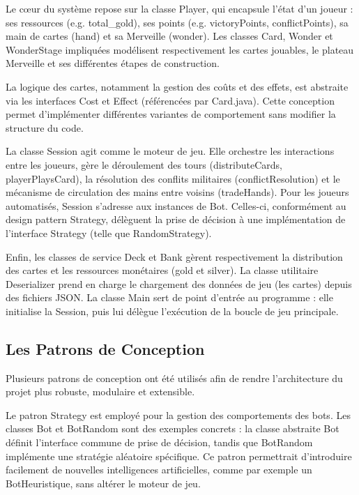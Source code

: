 Le cœur du système repose sur la classe Player, qui encapsule l'état d'un joueur : ses ressources (e.g. total\_gold), ses points (e.g. victoryPoints, conflictPoints), sa main de cartes (hand) et sa Merveille (wonder). Les classes Card, Wonder et WonderStage impliquées modélisent respectivement les cartes jouables, le plateau Merveille et ses différentes étapes de construction.

La logique des cartes, notamment la gestion des coûts et des effets, est abstraite via les interfaces Cost et Effect (référencées par Card.java). Cette conception permet d’implémenter différentes variantes de comportement sans modifier la structure du code.

La classe Session agit comme le moteur de jeu. Elle orchestre les interactions entre les joueurs, gère le déroulement des tours (distributeCards, playerPlaysCard), la résolution des conflits militaires (conflictResolution) et le mécanisme de circulation des mains entre voisins (tradeHands). Pour les joueurs automatisés, Session s'adresse aux instances de Bot. Celles-ci, conformément au design pattern Strategy, délèguent la prise de décision à une implémentation de l'interface Strategy (telle que RandomStrategy).

Enfin, les classes de service Deck et Bank gèrent respectivement la distribution des cartes et les ressources monétaires (gold et silver). La classe utilitaire Deserializer prend en charge le chargement des données de jeu (les cartes) depuis des fichiers JSON. La classe Main sert de point d'entrée au programme : elle initialise la Session, puis lui délègue l'exécution de la boucle de jeu principale.

\subsection{Les Patrons de Conception}
\label{sec:design-patterns}

Plusieurs patrons de conception ont été utilisés afin de rendre l’architecture du projet plus robuste, modulaire et extensible.

Le patron Strategy est employé pour la gestion des comportements des bots. Les classes Bot et BotRandom sont des exemples concrets : la classe abstraite Bot définit l’interface commune de prise de décision, tandis que BotRandom implémente une stratégie aléatoire spécifique. Ce patron permettrait d’introduire facilement de nouvelles intelligences artificielles, comme par exemple un BotHeuristique, sans altérer le moteur de jeu.

